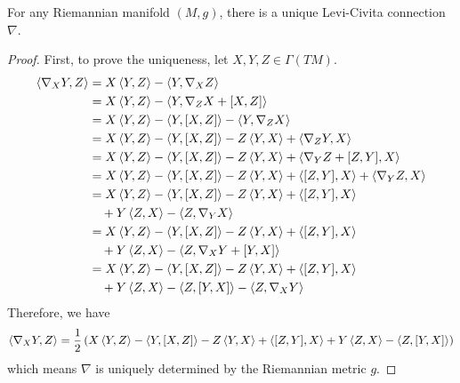 \begin{enumerate}[label=\arabic{*}.]
	\begin{thm}
		For any Riemannian manifold $(M,g)$, there is a unique Levi-Civita connection $\nabla$.
	\end{thm}
	\begin{proof}
		First, to prove the uniqueness, let $X,Y,Z \in \Gamma(TM)$.
		\begin{equation*}
			\begin{aligned}
				\inn{\nabla_XY,Z} &= X\inn{Y,Z} - \inn{Y,\nabla_XZ} \\
				&= X\inn{Y,Z} - \inn{Y,\nabla_ZX + [X,Z]} \\
				&= X\inn{Y,Z} - \inn{Y,[X,Z]} - \inn{Y,\nabla_ZX} \\
				&= X\inn{Y,Z} - \inn{Y,[X,Z]} - Z\inn{Y,X} + \inn{\nabla_ZY, X}\\
				&= X\inn{Y,Z} - \inn{Y,[X,Z]} - Z\inn{Y,X} + \inn{\nabla_YZ+[Z,Y],X} \\
				&= X\inn{Y,Z} - \inn{Y,[X,Z]} - Z\inn{Y,X} + \inn{[Z,Y],X} + \inn{\nabla_YZ,X} \\
				&= X\inn{Y,Z} - \inn{Y,[X,Z]} - Z\inn{Y,X} + \inn{[Z,Y],X}\\
				&\quad+ Y\inn{Z,X} - \inn{Z,\nabla_YX} \\
				&= X\inn{Y,Z} - \inn{Y,[X,Z]} - Z\inn{Y,X} + \inn{[Z,Y],X}\\
				&\quad+ Y\inn{Z,X} - \inn{Z,\nabla_XY + [Y,X]} \\
				&= X\inn{Y,Z} - \inn{Y,[X,Z]} - Z\inn{Y,X} + \inn{[Z,Y],X}\\
				&\quad+ Y\inn{Z,X} - \inn{Z, [Y,X]} -\inn{Z, \nabla_XY} \\
			\end{aligned}
		\end{equation*}
		Therefore, we have
		\begin{equation*}
			\inn{\nabla_XY,Z} = \frac{1}{2}\bc{X\inn{Y,Z} - \inn{Y,[X,Z]} - Z\inn{Y,X} + \inn{[Z,Y],X}+ Y\inn{Z,X} - \inn{Z, [Y,X]}}
		\end{equation*}
		which means $\nabla$ is uniquely determined by the Riemannian metric $g$.


\end{proof}
\end{enumerate}
